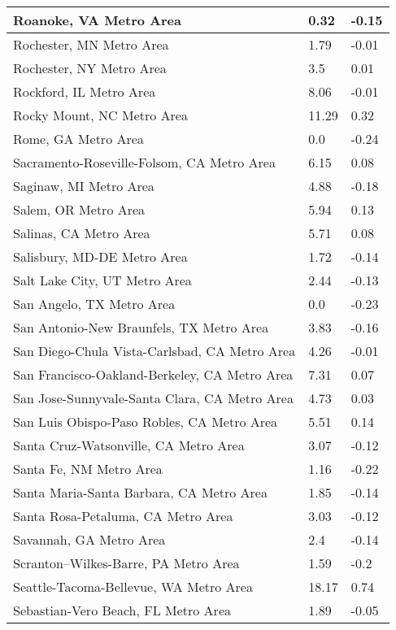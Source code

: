 \documentclass[12pt,oneside, letterpaper]{book}
\begin{document}
\begin{longtable}{| p{} | p{} | p{} |}
    Roanoke, VA Metro Area & 0.32 & -0.15 \\ \hline
    Rochester, MN Metro Area & 1.79 & -0.01 \\ \hline
    Rochester, NY Metro Area & 3.5 & 0.01 \\ \hline
    Rockford, IL Metro Area & 8.06 & -0.01 \\ \hline
    Rocky Mount, NC Metro Area & 11.29 & 0.32 \\ \hline
    Rome, GA Metro Area & 0.0 & -0.24 \\ \hline
    Sacramento-Roseville-Folsom, CA Metro Area & 6.15 & 0.08 \\ \hline
    Saginaw, MI Metro Area & 4.88 & -0.18 \\ \hline
    Salem, OR Metro Area & 5.94 & 0.13 \\ \hline
    Salinas, CA Metro Area & 5.71 & 0.08 \\ \hline
    Salisbury, MD-DE Metro Area & 1.72 & -0.14 \\ \hline
    Salt Lake City, UT Metro Area & 2.44 & -0.13 \\ \hline
    San Angelo, TX Metro Area & 0.0 & -0.23 \\ \hline
    San Antonio-New Braunfels, TX Metro Area & 3.83 & -0.16 \\ \hline
    San Diego-Chula Vista-Carlsbad, CA Metro Area & 4.26 & -0.01 \\ \hline
    San Francisco-Oakland-Berkeley, CA Metro Area & 7.31 & 0.07 \\ \hline
    San Jose-Sunnyvale-Santa Clara, CA Metro Area & 4.73 & 0.03 \\ \hline
    San Luis Obispo-Paso Robles, CA Metro Area & 5.51 & 0.14 \\ \hline
    Santa Cruz-Watsonville, CA Metro Area & 3.07 & -0.12 \\ \hline
    Santa Fe, NM Metro Area & 1.16 & -0.22 \\ \hline
    Santa Maria-Santa Barbara, CA Metro Area & 1.85 & -0.14 \\ \hline
    Santa Rosa-Petaluma, CA Metro Area & 3.03 & -0.12 \\ \hline
    Savannah, GA Metro Area & 2.4 & -0.14 \\ \hline
    Scranton--Wilkes-Barre, PA Metro Area & 1.59 & -0.2 \\ \hline
    Seattle-Tacoma-Bellevue, WA Metro Area & 18.17 & 0.74 \\ \hline
    Sebastian-Vero Beach, FL Metro Area & 1.89 & -0.05 \\ \hline

\end{longtable}
\end{document}
